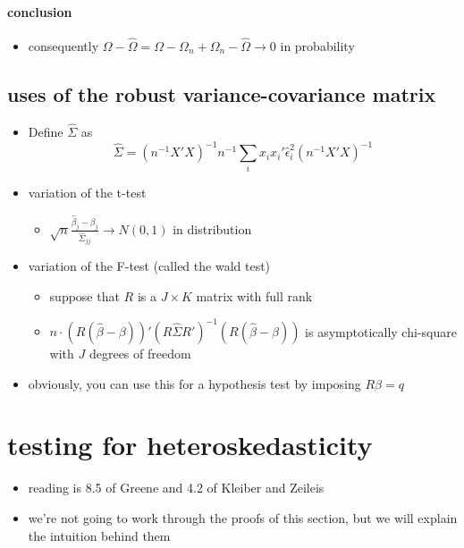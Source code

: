 \documentclass[11pt]{article}
\begin{document}
\paragraph{conclusion}
\label{sec-1-2-2-3}

\begin{itemize}
\item consequently $\Omega - \hat\Omega = \Omega - \Omega_n +
         \Omega_n - \hat\Omega \to 0$ in probability
\end{itemize}
\subsection{uses of the robust variance-covariance matrix}
\label{sec-1-3}

\begin{itemize}
\item Define $\hat\Sigma$ as 
       \[\hat\Sigma = (n^{-1} X'X)^{-1} n^{-1} \sum_i x_i x_i' \hat\epsilon_i^2 (n^{-1} X'X)^{-1}\]
\item variation of the t-test
\begin{itemize}
\item $\sqrt{n} \frac{\hat\beta_j - \beta_j}{\hat\Sigma_{jj}} \to
         N(0,1)$ in distribution
\end{itemize}
\item variation of the F-test (called the wald test)
\begin{itemize}
\item suppose that $R$ is a $J \times K$ matrix with full rank
\item $n \cdot (R(\hat\beta - \beta))'(R\hat\Sigma R')^{-1}
         (R(\hat\beta - \beta))$ is asymptotically chi-square with $J$
         degrees of freedom
\end{itemize}
\item obviously, you can use this for a hypothesis test by imposing
       $R\beta  = q$
\end{itemize}
\section{testing for heteroskedasticity}
\label{sec-2}

\begin{itemize}
\item reading is 8.5 of Greene and 4.2 of Kleiber and Zeileis
\item we're not going to work through the proofs of this section, but
      we will explain the intuition behind them
\end{itemize}
\end{document}
